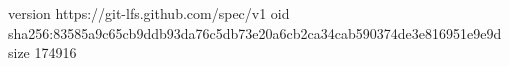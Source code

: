 version https://git-lfs.github.com/spec/v1
oid sha256:83585a9c65cb9ddb93da76c5db73e20a6cb2ca34cab590374de3e816951e9e9d
size 174916
